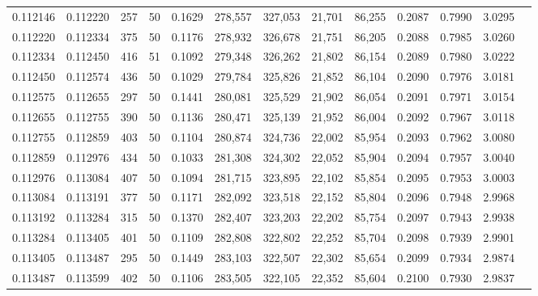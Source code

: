 \begin{tabular}{rrrrrrrrrrrrr}
0.112146 & 0.112220 &   257 &  50 &                                     0.1629 & 278,557 & 327,053 &  21,701 &  86,255 & 0.2087 & 0.7990 & 3.0295 \\
0.112220 & 0.112334 &   375 &  50 &                                     0.1176 & 278,932 & 326,678 &  21,751 &  86,205 & 0.2088 & 0.7985 & 3.0260 \\
0.112334 & 0.112450 &   416 &  51 &                                     0.1092 & 279,348 & 326,262 &  21,802 &  86,154 & 0.2089 & 0.7980 & 3.0222 \\
0.112450 & 0.112574 &   436 &  50 &                                     0.1029 & 279,784 & 325,826 &  21,852 &  86,104 & 0.2090 & 0.7976 & 3.0181 \\
0.112575 & 0.112655 &   297 &  50 &                                     0.1441 & 280,081 & 325,529 &  21,902 &  86,054 & 0.2091 & 0.7971 & 3.0154 \\
0.112655 & 0.112755 &   390 &  50 &                                     0.1136 & 280,471 & 325,139 &  21,952 &  86,004 & 0.2092 & 0.7967 & 3.0118 \\
0.112755 & 0.112859 &   403 &  50 &                                     0.1104 & 280,874 & 324,736 &  22,002 &  85,954 & 0.2093 & 0.7962 & 3.0080 \\
0.112859 & 0.112976 &   434 &  50 &                                     0.1033 & 281,308 & 324,302 &  22,052 &  85,904 & 0.2094 & 0.7957 & 3.0040 \\
0.112976 & 0.113084 &   407 &  50 &                                     0.1094 & 281,715 & 323,895 &  22,102 &  85,854 & 0.2095 & 0.7953 & 3.0003 \\
0.113084 & 0.113191 &   377 &  50 &                                     0.1171 & 282,092 & 323,518 &  22,152 &  85,804 & 0.2096 & 0.7948 & 2.9968 \\
0.113192 & 0.113284 &   315 &  50 &                                     0.1370 & 282,407 & 323,203 &  22,202 &  85,754 & 0.2097 & 0.7943 & 2.9938 \\
0.113284 & 0.113405 &   401 &  50 &                                     0.1109 & 282,808 & 322,802 &  22,252 &  85,704 & 0.2098 & 0.7939 & 2.9901 \\
0.113405 & 0.113487 &   295 &  50 &                                     0.1449 & 283,103 & 322,507 &  22,302 &  85,654 & 0.2099 & 0.7934 & 2.9874 \\
0.113487 & 0.113599 &   402 &  50 &                                     0.1106 & 283,505 & 322,105 &  22,352 &  85,604 & 0.2100 & 0.7930 & 2.9837 \\

\end{tabular}
